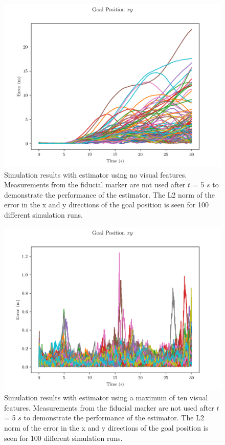 \begin{figure}
  \centering
  \includegraphics[scale=0.5]{plots/mc_no_lms_xy_err.png}
  \caption{Simulation results with estimator using no visual
  features. Measurements from the fiducial marker are not used after $t$ = 5
$s$ to demonstrate the performance of the estimator. The L2 norm of the error in
the x and y directions of the goal position is seen for 100 different simulation
runs.}
  \label{fig:mc_no_lms_xy_err}
\end{figure}

\begin{figure}
  \centering
  \includegraphics[scale=0.5]{plots/mc_with_lms_xy_err.png}
  \caption{Simulation results with estimator using a maximum of ten visual
  features. Measurements from the fiducial marker are not used after $t$ = 5
$s$ to demonstrate the performance of the estimator. The L2 norm of the error in
the x and y directions of the goal position is seen for 100 different simulation
runs.}
  \label{fig:mc_with_lms_xy_err}
\end{figure}

